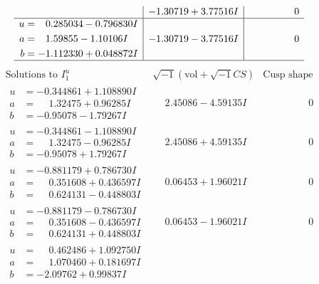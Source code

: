 \documentclass[1p]{elsarticle_modified}
\theoremstyle{definition}
\newcommand{\I}{\sqrt{-1}}
\begin{document}
$$\begin{array}{c|c|c}
 & -1.30719 + 3.77516 I & \phantom{-0.000000 } 0 \\ \hline\begin{aligned}
u &= \phantom{-}0.285034 - 0.796830 I \\
a &= \phantom{-}1.59855 - 1.10106 I \\
b &= -1.112330 + 0.048872 I\end{aligned}
 & -1.30719 - 3.77516 I & \phantom{-0.000000 } 0\\
 \hline 
 \end{array}$$\newpage$$\begin{array}{c|c|c}  
\text{Solutions to }I^u_{1}& \I (\text{vol} + \sqrt{-1}CS) & \text{Cusp shape}\\
 \hline 
\begin{aligned}
u &= -0.344861 + 1.108890 I \\
a &= \phantom{-}1.32475 + 0.96285 I \\
b &= -0.95078 - 1.79267 I\end{aligned}
 & \phantom{-}2.45086 - 4.59135 I & \phantom{-0.000000 } 0 \\ \hline\begin{aligned}
u &= -0.344861 - 1.108890 I \\
a &= \phantom{-}1.32475 - 0.96285 I \\
b &= -0.95078 + 1.79267 I\end{aligned}
 & \phantom{-}2.45086 + 4.59135 I & \phantom{-0.000000 } 0 \\ \hline\begin{aligned}
u &= -0.881179 + 0.786730 I \\
a &= \phantom{-}0.351608 + 0.436597 I \\
b &= \phantom{-}0.624131 - 0.448803 I\end{aligned}
 & \phantom{-}0.06453 + 1.96021 I & \phantom{-0.000000 } 0 \\ \hline\begin{aligned}
u &= -0.881179 - 0.786730 I \\
a &= \phantom{-}0.351608 - 0.436597 I \\
b &= \phantom{-}0.624131 + 0.448803 I\end{aligned}
 & \phantom{-}0.06453 - 1.96021 I & \phantom{-0.000000 } 0 \\ \hline\begin{aligned}
u &= \phantom{-}0.462486 + 1.092750 I \\
a &= \phantom{-}1.070460 + 0.181697 I \\
b &= -2.09762 + 0.99837 I\end{aligned}

\end{array}$$
\end{document}
